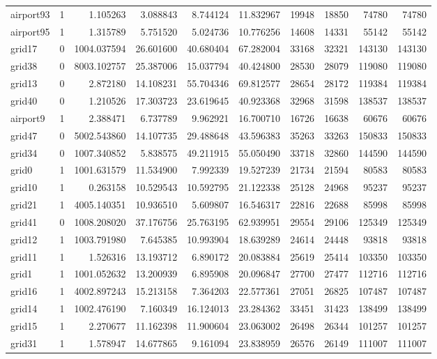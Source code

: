 \begin{longtable}{|l|r|r|r|r|r|r|r|r|r|}
airport93 & 1 & 1.105263 & 3.088843 & 8.744124 & 11.832967 & 19948 & 18850 & 74780 & 74780 \\
airport95 & 1 & 1.315789 & 5.751520 & 5.024736 & 10.776256 & 14608 & 14331 & 55142 & 55142 \\
grid17 & 0 & 1004.037594 & 26.601600 & 40.680404 & 67.282004 & 33168 & 32321 & 143130 & 143130 \\
grid38 & 0 & 8003.102757 & 25.387006 & 15.037794 & 40.424800 & 28530 & 28079 & 119080 & 119080 \\
grid13 & 0 & 2.872180 & 14.108231 & 55.704346 & 69.812577 & 28654 & 28172 & 119384 & 119384 \\
grid40 & 0 & 1.210526 & 17.303723 & 23.619645 & 40.923368 & 32968 & 31598 & 138537 & 138537 \\
airport9 & 1 & 2.388471 & 6.737789 & 9.962921 & 16.700710 & 16726 & 16638 & 60676 & 60676 \\
grid47 & 0 & 5002.543860 & 14.107735 & 29.488648 & 43.596383 & 35263 & 33263 & 150833 & 150833 \\
grid34 & 0 & 1007.340852 & 5.838575 & 49.211915 & 55.050490 & 33718 & 32860 & 144590 & 144590 \\
grid0 & 1 & 1001.631579 & 11.534900 & 7.992339 & 19.527239 & 21734 & 21594 & 80583 & 80583 \\
grid10 & 1 & 0.263158 & 10.529543 & 10.592795 & 21.122338 & 25128 & 24968 & 95237 & 95237 \\
grid21 & 1 & 4005.140351 & 10.936510 & 5.609807 & 16.546317 & 22816 & 22688 & 85998 & 85998 \\
grid41 & 0 & 1008.208020 & 37.176756 & 25.763195 & 62.939951 & 29554 & 29106 & 125349 & 125349 \\
grid12 & 1 & 1003.791980 & 7.645385 & 10.993904 & 18.639289 & 24614 & 24448 & 93818 & 93818 \\
grid11 & 1 & 1.526316 & 13.193712 & 6.890172 & 20.083884 & 25619 & 25414 & 103350 & 103350 \\
grid1 & 1 & 1001.052632 & 13.200939 & 6.895908 & 20.096847 & 27700 & 27477 & 112716 & 112716 \\
grid16 & 1 & 4002.897243 & 15.213158 & 7.364203 & 22.577361 & 27051 & 26825 & 107487 & 107487 \\
grid14 & 1 & 1002.476190 & 7.160349 & 16.124013 & 23.284362 & 33451 & 31423 & 138499 & 138499 \\
grid15 & 1 & 2.270677 & 11.162398 & 11.900604 & 23.063002 & 26498 & 26344 & 101257 & 101257 \\
grid31 & 1 & 1.578947 & 14.677865 & 9.161094 & 23.838959 & 26576 & 26149 & 111007 & 111007 \\

\end{longtable}
